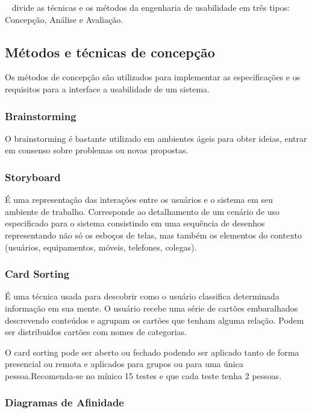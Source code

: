 	~ divide as técnicas e os métodos da engenharia de usabilidade em três tipos: Concepção, Análise e Avaliação.

\subsection{Métodos e técnicas de concepção}

	Os métodos de concepção são utilizados para implementar as especificações e os requisitos para a interface a usabilidade de um sistema.

\subsubsection{Brainstorming}

	O brainstorming é bastante utilizado em ambientes ágeis para obter ideias, entrar em consenso sobre problemas ou novas propostas.

\subsubsection{Storyboard}

É uma representação das interações entre os usuários e o sistema em seu ambiente de trabalho. Corresponde ao detalhamento de um cenário de uso especificado para o sistema consistindo em uma sequência de desenhos representando não só os esboços de telas, mas também os elementos do contexto (usuários, equipamentos, móveis, telefones, colegas).

\subsubsection{Card Sorting}

	É uma técnica usada para descobrir como o usuário classifica determinada informação em sua mente. O usuário recebe uma série de cartões embaralhados descrevendo conteúdos e agrupam os cartões que tenham alguma relação. Podem ser distribuidos cartões com nomes de categorias.
	
	O card sorting pode ser aberto ou fechado podendo ser aplicado tanto de forma presencial ou remota e aplicados para grupos ou para uma única pessoa.Recomenda-se no mínico 15 testes e que cada teste tenha 2 pessoas.
	
\subsubsection{Diagramas de Afinidade}

